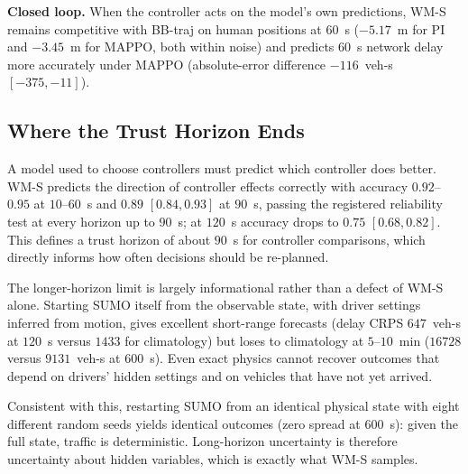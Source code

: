 \documentclass[conference]{IEEEtran}
\begin{document}
\textbf{Closed loop.} When the controller acts on the model's own predictions, WM-S remains competitive with BB-traj on human positions at $60$~s ($-5.17$~m for PI and $-3.45$~m for MAPPO, both within noise) and predicts $60$~s network delay more accurately under MAPPO (absolute-error difference $-116$~veh-s $[-375,-11]$). %

\subsection{Where the Trust Horizon Ends}
A model used to choose controllers must predict which controller does better. WM-S predicts the direction of controller effects correctly with accuracy $0.92$--$0.95$ at $10$--$60$~s and $0.89$ $[0.84,0.93]$ at $90$~s, passing the registered reliability test at every horizon up to $90$~s; at $120$~s accuracy drops to $0.75$ $[0.68,0.82]$. %
This defines a trust horizon of about $90$~s for controller comparisons, which directly informs how often decisions should be re-planned. %

The longer-horizon limit is largely informational rather than a defect of WM-S alone. Starting SUMO itself from the observable state, with driver settings inferred from motion, gives excellent short-range forecasts (delay CRPS $647$~veh-s at $120$~s versus $1433$ for climatology) but loses to climatology at $5$--$10$~min ($16728$ versus $9131$~veh-s at $600$~s). %
Even exact physics cannot recover outcomes that depend on drivers' hidden settings and on vehicles that have not yet arrived.

Consistent with this, restarting SUMO from an identical physical state with eight different random seeds yields identical outcomes (zero spread at $600$~s): given the full state, traffic is deterministic. %
Long-horizon uncertainty is therefore uncertainty about hidden variables, which is exactly what WM-S samples.
\end{document}
